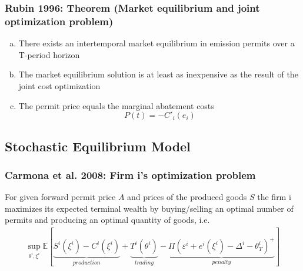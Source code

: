 \begin{frame}
\frametitle{Rubin 1996: Theorem (Market equilibrium and joint optimization problem)}
\begin{enumerate}[(a)]
\item There exists an intertemporal market equilibrium in emission permits over a T-period horizon
\item The market equilibrium solution is at least as inexpensive as the result of the joint cost optimization
\item The permit price equals the marginal abatement costs
\[
P(t) = - C'_i(e_i)
\]

\end{enumerate}
\end{frame}




\subsection{Stochastic Equilibrium Model}
\begin{frame}
\frametitle{Carmona et al. 2008: Firm i's optimization problem}
For given forward permit price $A$ and prices of the produced goods $S$ the firm i maximizes its expected terminal wealth by  buying/selling an optimal number of permits and producing an optimal quantity of goods, i.e.
\begin{align}
\sup_{\theta^i, \xi^i} \mathbb{E} \left[ \underbrace{S^i(\xi^i) - C^i(\xi^i)}_{production} + \underbrace{T^i(\theta^i)}_{trading} - \underbrace{\Pi \left(\varepsilon^i + e^i(\xi^i) - \Delta^i - \theta^i_T \right)^+}_{penalty} \right]
\end{align}
\end{frame}


